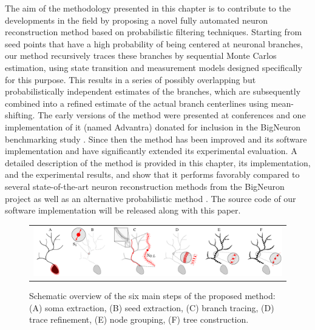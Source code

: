 The aim of the methodology presented in this chapter is to contribute to the developments in the field by proposing a novel fully automated neuron reconstruction method based on probabilistic filtering techniques. Starting from seed points that have a high probability of being centered at neuronal branches, our method recursively traces these branches by sequential Monte Carlos estimation, using state transition and measurement models designed specifically for this purpose. This results in a series of possibly overlapping but probabilistically independent estimates of the branches, which are subsequently combined into a refined estimate of the actual branch centerlines using mean-shifting. The early versions of the method were presented at conferences \cite{radojevic2015automated, radojevic2017neuron} and one implementation of it (named Advantra) donated for inclusion in the BigNeuron benchmarking study \cite{peng2015bigneuron, peng2015diadem}. Since then the method has been improved and its software implementation and have significantly extended its experimental evaluation. A detailed description of the method is provided in this chapter, its implementation, and the experimental results, and show that it performs favorably compared to several state-of-the-art neuron reconstruction methods from the BigNeuron project as well as an alternative probabilistic method \cite{radojevic2017automated}. The source code of our software implementation will be released along with this paper.

\begin{figure}
	\begin{tabular}{c}
		\includegraphics[width=\textwidth]{fig1}
	\end{tabular}
	\caption{Schematic overview of the six main steps of the proposed method: (A) soma extraction, (B) seed extraction, (C) branch tracing, (D) trace refinement, (E) node grouping, (F) tree construction.}
	\label{fig1}
\end{figure}


